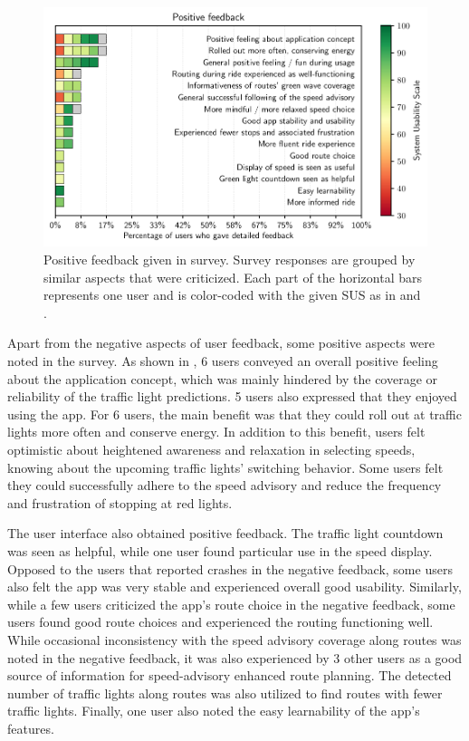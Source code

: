 \begin{figure}[t]
\caption{Positive feedback given in survey. Survey responses are grouped by similar aspects that were criticized. Each part of the horizontal bars represents one user and is color-coded with the given SUS as in  and .}\label{fig:app-positive-feedback}
\includegraphics[width=\linewidth]{images/app-feedback-positive.pdf}
\end{figure}

Apart from the negative aspects of user feedback, some positive aspects were noted in the survey. As shown in , 6 users conveyed an overall positive feeling about the application concept, which was mainly hindered by the coverage or reliability of the traffic light predictions. 5 users also expressed that they enjoyed using the app. For 6 users, the main benefit was that they could roll out at traffic lights more often and conserve energy. In addition to this benefit, users felt optimistic about heightened awareness and relaxation in selecting speeds, knowing about the upcoming traffic lights' switching behavior. Some users felt they could successfully adhere to the speed advisory and reduce the frequency and frustration of stopping at red lights.

The user interface also obtained positive feedback. The traffic light countdown was seen as helpful, while one user found particular use in the speed display. Opposed to the users that reported crashes in the negative feedback, some users also felt the app was very stable and experienced overall good usability. Similarly, while a few users criticized the app's route choice in the negative feedback, some users found good route choices and experienced the routing functioning well. While occasional inconsistency with the speed advisory coverage along routes was noted in the negative feedback, it was also experienced by 3 other users as a good source of information for speed-advisory enhanced route planning. The detected number of traffic lights along routes was also utilized to find routes with fewer traffic lights. Finally, one user also noted the easy learnability of the app's features.

